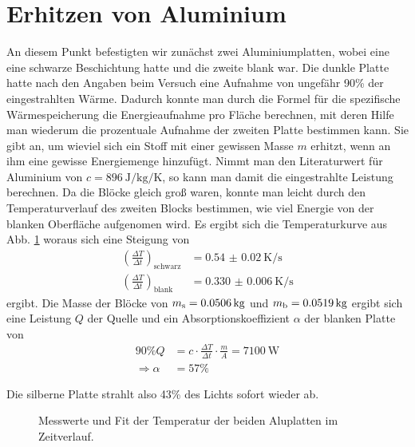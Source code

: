 \documentclass[12pt,a4paper,titlepage,headinclude,bibtotoc]{scrartcl}
\begin{document}
\section{Erhitzen von Aluminium}
An diesem Punkt befestigten wir zunächst zwei Aluminiumplatten, wobei eine eine schwarze Beschichtung hatte und die zweite blank war.
Die dunkle Platte hatte nach den Angaben beim Versuch eine Aufnahme von ungefähr 90\% der eingestrahlten Wärme.
Dadurch konnte man durch die Formel für die spezifische Wärmespeicherung die Energieaufnahme pro Fläche berechnen, mit deren Hilfe man wiederum die prozentuale Aufnahme der zweiten Platte bestimmen kann.
Sie gibt an, um wieviel sich ein Stoff mit einer gewissen Masse $m$ erhitzt, wenn an ihm eine gewisse Energiemenge hinzufügt.
Nimmt man den Literaturwert für Aluminium von $c=\SI{896}{\joule\per\kilo\gram\per\kelvin}$, so kann man damit die eingestrahlte Leistung berechnen.
Da die Blöcke gleich groß waren, konnte man leicht durch den Temperaturverlauf des zweiten Blocks bestimmen, wie viel Energie von der blanken Oberfläche aufgenomen wird.
Es ergibt sich die Temperaturkurve aus Abb. \ref{fig:aluSW} woraus sich eine Steigung von
\begin{align*}
	\left( \frac{\Delta T}{\Delta t} \right)_\text{schwarz}&=\SI{0.54(2)}{\kelvin \per \second}\\
	\left( \frac{\Delta T}{\Delta t} \right)_\text{blank}&=\SI{0.330(6)}{\kelvin \per \second}
\end{align*}
ergibt.
Die Masse der Blöcke von $m_\text s= \SI{0.0506}{\kilo\gram}$ und $m_\text b = \SI{0.0519}{\kilo\gram}$ ergibt sich eine Leistung $Q$ der Quelle und ein Absorptionskoeffizient $\alpha$ der blanken Platte von
\begin{align*}
	90\% Q &= c\cdot  \frac{\Delta T}{\Delta t}\cdot \frac{m}{A} = \SI{7100}{\watt}\\
	\Rightarrow \alpha &= 57\%
\end{align*}

Die silberne Platte strahlt also 43\% des Lichts sofort wieder ab.

\begin{figure}[h]
	\centering
	
	\caption{Messwerte und Fit der Temperatur der beiden Aluplatten im Zeitverlauf.}
	\label{fig:aluSW}
\end{figure}


\newpage
\end{document}
